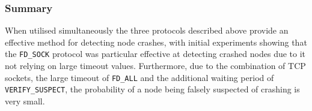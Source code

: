      \subsubsection*{Summary} 
    When utilised simultaneously the three protocols described above provide an effective method for detecting node crashes, with initial experiments showing that the \texttt{FD\_SOCK} protocol was particular effective at detecting crashed nodes due to it not relying on large timeout values.  Furthermore, due to the combination of TCP sockets, the large timeout of \texttt{FD\_ALL} and the additional waiting period of \texttt{VERIFY\_SUSPECT}, the probability of a node being falsely suspected of crashing is very small.  